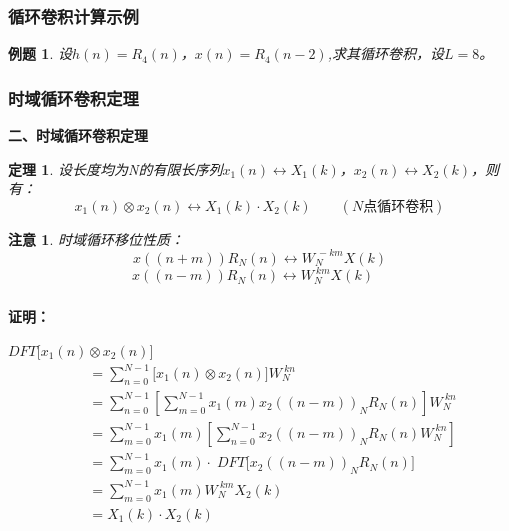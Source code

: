 \documentclass[notheorems,compress,mathserif,table]{beamer}
\newtheorem{theorem}{定理}
\newtheorem{example}{例题}
\newtheorem{zhuyi}{注意}
\begin{document}
\begin{frame}[shrink]\frametitle{循环卷积计算示例}%
\begin{example}
设$h(n)=R_4(n)$，$x(n) = R_4(n-2)$,求其循环卷积，设$L=8$。
\end{example}
\end{frame}
%
%
%
\begin{frame}[shrink]\frametitle{时域循环卷积定理}%
\textbf{二、时域循环卷积定理}
\begin{theorem}
设长度均为N的有限长序列$x_1(n)\leftrightarrow X_1(k)$，$x_2(n)\leftrightarrow X_2(k)$，则有：
$$x_1(n)\otimes x_2(n) \longleftrightarrow X_1(k)\cdot X_2(k) \quad\quad (\mbox{$N$点循环卷积})$$
\end{theorem}
\begin{zhuyi}
时域循环移位性质：
$$x((n+m))R_N(n)\longleftrightarrow W_N^{\:-km}X(k)$$
$$x((n-m))R_N(n)\longleftrightarrow W_N^{\:km}X(k)\quad$$
\end{zhuyi}
\end{frame}

\begin{frame}[shrink]\frametitle{}%
\textbf{证明：}

$DFT\big[ x_1(n)\otimes x_2(n)\big]$
\begin{equation*}
\begin{split}
    \quad
         &= \sum_{n=0}^{N-1}\bigg[x_1(n)\otimes x_2(n)\bigg]W_N^{\:kn} \\
         &= \sum_{n=0}^{N-1}\left[\sum_{m=0}^{N-1}x_1(m) x_2((n-m))_N R_N(n) \right] W_N^{\:kn}   \\
         &= \sum_{m=0}^{N-1}x_1(m)\left[ \sum_{n=0}^{N-1} x_2((n-m))_N R_N(n) W_N^{\:kn} \right]   \\
         &= \sum_{m=0}^{N-1}x_1(m) \cdot\;  DFT\Big[  x_2((n-m))_N R_N(n) \Big]  \quad   \\
         &= \sum_{m=0}^{N-1}x_1(m)W_N^{\:km} X_2(k)  \;\qquad\qquad      \\
         &= X_1(k)\cdot X_2(k)
\end{split}
\end{equation*}
\end{frame}
%
%
\end{document}
